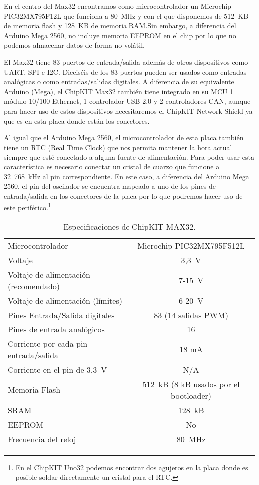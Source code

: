 En el centro del Max32 encontramos como microcontrolador un Microchip PIC32MX795F12L que funciona a 80~MHz y con el que disponemos de 512~KB de memoria flash y 128~KB de memoria RAM.\@ Sin embargo, a diferencia del Arduino Mega 2560, no incluye memoria EEPROM en el chip por lo que no podemos almacenar datos de forma no volátil. 

El Max32 tiene 83 puertos de entrada/salida además de otros dispositivos como UART, SPI e I2C. Dieciséis de los 83 puertos pueden ser usados como entradas analógicas o como entradas/salidas digitales. A diferencia de su equivalente Arduino (Mega), el ChipKIT Max32 también tiene integrado en su MCU 1 módulo 10/100 Ethernet, 1 controlador USB 2.0 y 2 controladores CAN, aunque para hacer uso de estos dispositivos necesitaremos el ChipKIT Network Shield ya que es en esta placa donde están los conectores. 

Al igual que el Arduino Mega 2560, el microcontrolador de esta placa también tiene un RTC (Real Time Clock) que nos permita mantener la hora actual siempre que esté conectado a alguna fuente de alimentación. Para poder usar esta característica es necesario conectar un cristal de cuarzo que funcione a 32~768~kHz al pin correspondiente. En este caso, a diferencia del Arduino Mega 2560, el pin del oscilador se encuentra mapeado a uno de los pines de entrada/salida en los conectores de la placa por lo que podremos hacer uso de este periférico.\footnote{En el ChipKIT Uno32 podemos encontrar dos agujeros en la placa donde es posible soldar directamente un cristal para el RTC.}

\begin{table}[H]
\begin{center}
\begin{tabular}{| l | c |}
\hline
Microcontrolador 						& Microchip PIC32MX795F512L \\
Voltaje									& 3,3~V \\
Voltaje de alimentación (recomendado) 	& 7-15~V \\
Voltaje de alimentación (límites) 		& 6-20~V \\
Pines Entrada/Salida digitales			& 83 (14 salidas PWM) \\
Pines de entrada analógicos				& 16 \\
Corriente por cada pin entrada/salida 	& 18 mA \\
Corriente en el pin de 3,3~V				& N/A  \\
Memoria Flash 							& 512~kB (8 kB usados por el bootloader) \\
SRAM									& 128~kB \\
EEPROM									& No \\
Frecuencia del reloj					& 80~MHz \\
\hline
\end{tabular}
\end{center}
\caption{Especificaciones de ChipKIT MAX32.}
\label{tab:max32_specs}
\end{table}

